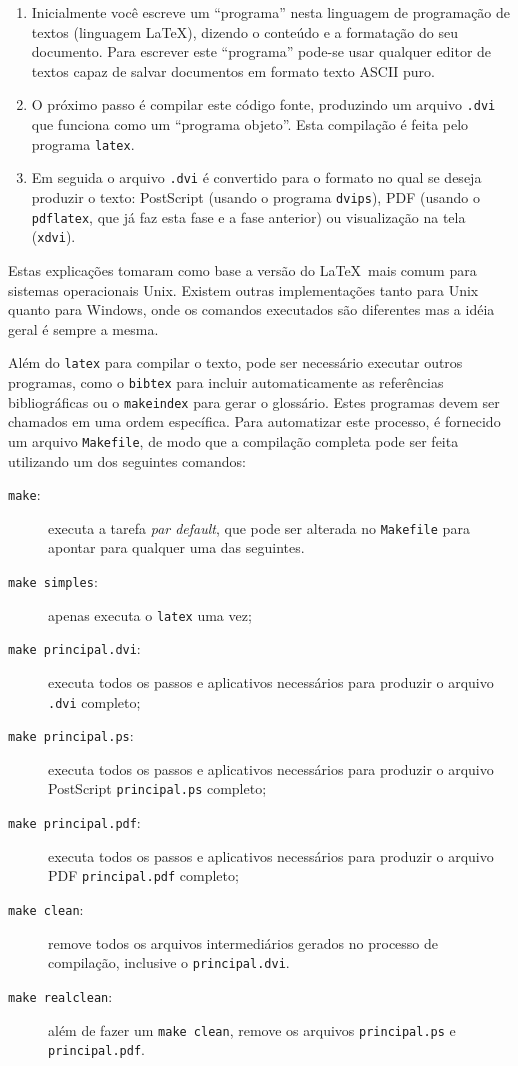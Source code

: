 %
\begin{enumerate}
\item Inicialmente você escreve um ``programa'' nesta linguagem de
programação de textos (linguagem \LaTeX), dizendo o conteúdo e a
formatação do seu documento.  Para escrever este ``programa'' pode-se
usar qualquer editor de textos capaz de salvar documentos em formato
texto ASCII puro.
\item O próximo passo é compilar este código fonte, produzindo um arquivo
\texttt{.dvi} que funciona como um ``programa objeto''. Esta compilação
é feita pelo programa \texttt{latex}.
\item Em seguida o arquivo \texttt{.dvi} é convertido para o formato no
qual se deseja produzir o texto: PostScript (usando o programa
\texttt{dvips}), PDF (usando o \texttt{pdflatex}, que já faz esta fase
e a fase anterior) ou visualização na tela (\texttt{xdvi}).
\end{enumerate}

Estas explicações tomaram como base a versão do \LaTeX\ mais comum para
sistemas operacionais Unix. Existem outras implementações tanto para
Unix quanto para Windows, onde os comandos executados são diferentes
mas a idéia geral é sempre a mesma.

Além do \texttt{latex} para compilar o texto, pode ser necessário
executar outros programas, como o \texttt{bibtex} para incluir
automaticamente as referências bibliográficas ou o \texttt{makeindex}
para gerar o glossário. Estes programas devem ser chamados em uma
ordem específica. Para automatizar este processo, é fornecido um
arquivo \texttt{Makefile}, de modo que a compilação completa pode
ser feita utilizando um dos seguintes comandos:%
%
\begin{description}
\item[{\tt make}:] executa a tarefa \emph{par default}, que pode ser
alterada no \texttt{Makefile} para apontar para qualquer uma das seguintes.
\item[{\tt make simples}:] apenas executa o \texttt{latex} uma vez;
\item[{\tt make principal.dvi}:] executa todos os passos e aplicativos
necessários para produzir o arquivo \texttt{.dvi} completo;
\item[{\tt make principal.ps}:] executa todos os passos e aplicativos
necessários para produzir o arquivo PostScript \texttt{principal.ps}
completo;
\item[{\tt make principal.pdf}:] executa todos os passos e aplicativos
necessários para produzir o arquivo PDF \texttt{principal.pdf} completo;
\item[{\tt make clean}:] remove todos os arquivos intermediários gerados
no processo de compilação, inclusive o \texttt{principal.dvi}.
\item[{\tt make realclean}:] além de fazer um \texttt{make clean}, remove
os arquivos \texttt{principal.ps} e \texttt{principal.pdf}.
\end{description}

